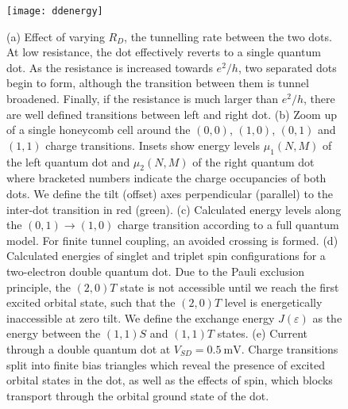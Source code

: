 \begin{figure}
  \texttt{[image: ddenergy]}
  \caption[Energy levels and spin in a double quantum dot]
  {\label{fig:dqdenergy}(a) Effect of varying $R_D$, the tunnelling rate between the two
  dots. At low resistance, the dot effectively reverts to a single quantum dot. As the resistance is increased towards
  $e^2/h$, two separated dots begin to form, although the transition between them is tunnel broadened.
  Finally, if the resistance is much larger than $e^2/h$, there are well defined transitions between left and right
  dot. (b) Zoom up of a single honeycomb cell around the $(0, 0)$, $(1, 0)$, $(0, 1)$ and $(1, 1)$ charge transitions.
  Insets show energy levels $\mu_1(N, M)$ of the left quantum dot and $\mu_2(N, M)$ of the right quantum dot where bracketed
  numbers indicate the charge occupancies of both dots. We define the tilt (offset) axes perpendicular (parallel) to the
  inter-dot transition in red (green). (c) Calculated energy levels along the $(0,1) \rightarrow (1,0)$ charge transition according
  to a full quantum model. For finite tunnel coupling, an avoided crossing is formed. (d) Calculated energies of singlet and
  triplet spin configurations for a two-electron double quantum dot. Due to the Pauli exclusion principle, the $(2, 0)T$
  state is not accessible until we reach the first excited orbital state, such that the $(2, 0)T$ level is energetically
  inaccessible at zero tilt. We define the exchange energy $J(\varepsilon)$ as the energy between the $(1, 1)S$ and $(1, 1)T$
  states. (e) Current through a double quantum dot at $V_{SD} = \SI{0.5}{\milli\volt}$. Charge transitions split into finite bias triangles
  which reveal the presence of excited orbital states in the dot, as well as the effects of spin, which blocks transport through the orbital ground state of the dot.}
\end{figure}

